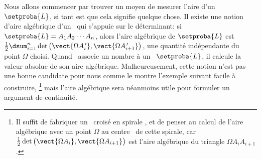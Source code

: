 Nous allons commencer par trouver un moyen de mesurer l'aire d'un \ncycle\ $\setproba{L}$, si tant est que cela signifie quelque chose. 
Il existe une notion d'aire algébrique d'un \ncycle\ qui s'appuie sur le déterminant: si $\setproba{L} = A_1 A_2 \cdots A_n$, alors l'aire algébrique de $\setproba{L}$ est $\frac12 \dsum_{i=1}^{n} \det \big( \vect{\Omega A^{\,\prime}_i} , \vect{\Omega A^{\,\prime}_{i+1}} \big)$, une quantité indépendante du point $\Omega$ choisi.
Quand \geogebra\ associe un nombre à un \ncycle\ $\setproba{L}$, il calcule la valeur absolue de son aire algébrique.
Malheureusement, cette notion n'est pas une bonne candidate pour nous comme le montre l'exemple suivant facile à construire,%
\footnote{
	Il suffit de fabriquer un \ngone\ croisé en \og spirale \fg, et de penser au calcul de l'aire algébrique avec un point $\Omega$ au \og centre \fg\ de cette spirale, car $\frac12 \det \big( \vect{\Omega A_i} , \vect{\Omega A_{i+1}} \big)$ est l'aire algébrique du triangle $\Omega A_i A_{i+1}$.
}
mais l'aire algébrique sera néanmoins utile pour formuler un argument de continuité.



